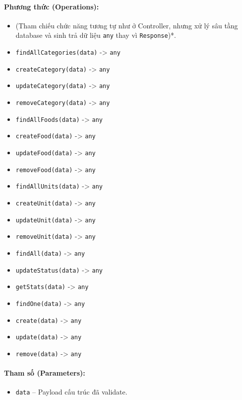 \documentclass[12pt,a4paper]{article}
\begin{document}
\paragraph{Phương thức (Operations):}
\begin{itemize}[leftmargin=*]
    \item (Tham chiếu chức năng tương tự như ở Controller, nhưng xử lý sâu tầng database và sinh trả dữ liệu \texttt{any} thay vì \texttt{Response})*.
    \item \texttt{findAllCategories(data)} -\textgreater{} \texttt{any}
    \item \texttt{createCategory(data)} -\textgreater{} \texttt{any}
    \item \texttt{updateCategory(data)} -\textgreater{} \texttt{any}
    \item \texttt{removeCategory(data)} -\textgreater{} \texttt{any}
    \item \texttt{findAllFoods(data)} -\textgreater{} \texttt{any}
    \item \texttt{createFood(data)} -\textgreater{} \texttt{any}
    \item \texttt{updateFood(data)} -\textgreater{} \texttt{any}
    \item \texttt{removeFood(data)} -\textgreater{} \texttt{any}
    \item \texttt{findAllUnits(data)} -\textgreater{} \texttt{any}
    \item \texttt{createUnit(data)} -\textgreater{} \texttt{any}
    \item \texttt{updateUnit(data)} -\textgreater{} \texttt{any}
    \item \texttt{removeUnit(data)} -\textgreater{} \texttt{any}
    \item \texttt{findAll(data)} -\textgreater{} \texttt{any}
    \item \texttt{updateStatus(data)} -\textgreater{} \texttt{any}
    \item \texttt{getStats(data)} -\textgreater{} \texttt{any}
    \item \texttt{findOne(data)} -\textgreater{} \texttt{any}
    \item \texttt{create(data)} -\textgreater{} \texttt{any}
    \item \texttt{update(data)} -\textgreater{} \texttt{any}
    \item \texttt{remove(data)} -\textgreater{} \texttt{any}
\end{itemize}


\paragraph{Tham số (Parameters):}
\begin{itemize}[leftmargin=*]
    \item \texttt{data} – Payload cấu trúc đã validate.
\end{itemize}
\end{document}
